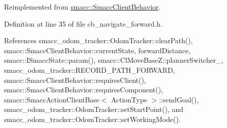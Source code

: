 Reimplemented from \hyperlink{classsmacc_1_1SmaccClientBehavior_a7962382f93987c720ad432fef55b123f}{smacc\+::\+Smacc\+Client\+Behavior}.



Definition at line 35 of file cb\+\_\+navigate\+\_\+forward.\+h.



References smacc\+\_\+odom\+\_\+tracker\+::\+Odom\+Tracker\+::clear\+Path(), smacc\+::\+Smacc\+Client\+Behavior\+::current\+State, forward\+Distance, smacc\+::\+I\+Smacc\+State\+::param(), smacc\+::\+Cl\+Move\+Base\+Z\+::planner\+Switcher\+\_\+, smacc\+\_\+odom\+\_\+tracker\+::\+R\+E\+C\+O\+R\+D\+\_\+\+P\+A\+T\+H\+\_\+\+F\+O\+R\+W\+A\+RD, smacc\+::\+Smacc\+Client\+Behavior\+::requires\+Client(), smacc\+::\+Smacc\+Client\+Behavior\+::requires\+Component(), smacc\+::\+Smacc\+Action\+Client\+Base$<$ Action\+Type $>$\+::send\+Goal(), smacc\+\_\+odom\+\_\+tracker\+::\+Odom\+Tracker\+::set\+Start\+Point(), and smacc\+\_\+odom\+\_\+tracker\+::\+Odom\+Tracker\+::set\+Working\+Mode().


